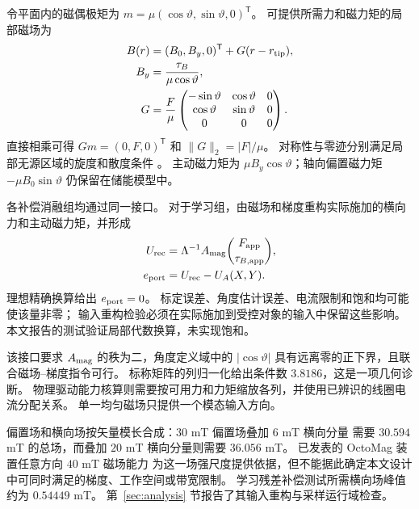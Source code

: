 令平面内的磁偶极矩为 $m=\mu(\cos\vartheta,\sin\vartheta,0)^{\mathsf T}$。
可提供所需力和磁力矩的局部磁场为
\begin{align}
 B(r)&=(B_0,B_y,0)^{\mathsf T}+G(r-r_{\rm tip}),\nonumber\\
 B_y&=\frac{\tau_B}{\mu\cos\vartheta},\nonumber\\
 G&=\frac{F}{\mu}
 \begin{pmatrix}
 -\sin\vartheta&\cos\vartheta&0\\
 \cos\vartheta&\sin\vartheta&0\\
 0&0&0
 \end{pmatrix}.
 \label{app:field-gradient}
\end{align}
直接相乘可得 $Gm=(0,F,0)^{\mathsf T}$ 和 $\|G\|_2=|F|/\mu$。
对称性与零迹分别满足局部无源区域的旋度和散度条件 \citep{abbott}。
主动磁力矩为 $\mu B_y\cos\vartheta$；轴向偏置磁力矩
$-\mu B_0\sin\vartheta$ 仍保留在储能模型中。

各补偿消融组均通过同一接口。
对于学习组，由磁场和梯度重构实际施加的横向力和主动磁力矩，并形成
\begin{align}
 U_{\rm rec}&=\Lambda^{-1}A_{\rm mag}
                    \binom{F_{\rm app}}{\tau_{B,\rm app}},\nonumber\\
 e_{\rm port}&=U_{\rm rec}-U_A(X,Y).
 \label{app:input-reconstruction}
\end{align}
理想精确换算给出 $e_{\rm port}=0$。
标定误差、角度估计误差、电流限制和饱和均可能使该量非零；
输入重构检验必须在实际施加到受控对象的输入中保留这些影响。
本文报告的测试验证局部代数换算，未实现饱和。

该接口要求 $A_{\rm mag}$ 的秩为二，角度定义域中的 $|\cos\vartheta|$
具有远离零的正下界，且联合磁场--梯度指令可行。
标称矩阵的列归一化给出条件数 $3.8186$，这是一项几何诊断。
物理驱动能力核算则需要按可用力和力矩缩放各列，并使用已辨识的线圈电流分配关系。
单一均匀磁场只提供一个模态输入方向。

偏置场和横向场按矢量模长合成：$30$ mT 偏置场叠加 $6$ mT 横向分量
需要 $30.594$ mT 的总场，而叠加 $20$ mT 横向分量则需要 $36.056$ mT。
已发表的 OctoMag 装置任意方向 $40$ mT 磁场能力 \citep{lussi2021cvs}
为这一场强尺度提供依据，但不能据此确定本文设计中可同时满足的梯度、工作空间或带宽限制。
学习残差补偿测试所需横向场峰值约为 $0.54449$ mT。
第~\ref{sec:analysis} 节报告了其输入重构与采样运行域检查。

